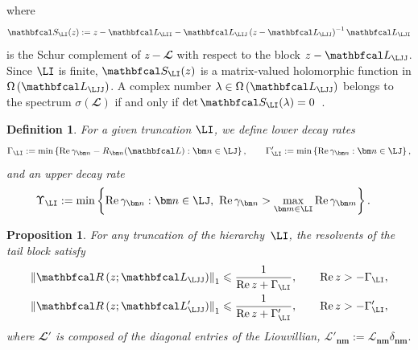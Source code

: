 \documentclass{SciPost}
\renewcommand{\Re}{\operatorname{Re}}
\newtheorem{definition}{Definition}
\newtheorem{proposition}{Proposition}
\begin{document}
where
\begin{equation}
    \mathbfcal S_\LI(z) := z - \mathbfcal L_\LII - \mathbfcal L_\LIJ
    \left(z - \mathbfcal L_\LJJ\right)^{-1} \mathbfcal L_\LJI
\end{equation}
is the Schur complement of \(z-\mathbfcal L\) with respect to the block \(z-\mathbfcal L_\LJJ\). Since \(\LI\) is finite, \(\mathbfcal S_\LI(z)\) is a matrix-valued holomorphic function in \(\Omega\left(\mathbfcal L_\LJJ\right)\). A complex number \(\lambda \in \Omega\left(\mathbfcal L_\LJJ\right)\) belongs to the spectrum \(\sigma(\mathbfcal L)\) if and only if
$\det \mathbfcal S_\LI(\lambda) = 0$~\cite{Griesemer2008}.

\begin{definition}
    For a given truncation \(\LI\), we define \emph{lower decay rates}
    \begin{equation}
        \Gamma_\LI
        :=
        \min \left \{
            \Re \gamma_{\bm n} - R_{\bm n}(\mathbfcal L):
            \bm n \in \LJ
        \right\},
        \qquad
        \Gamma_\LI'
        :=
        \min \left \{
            \Re \gamma_{\bm n} :
            \bm n \in \LJ
        \right\}
        ,
    \end{equation}
    and an \emph{upper decay rate}
    \begin{equation}
        \begin{aligned}
            \Upsilon_\LI
            &:=
            \min \left \{
                \Re \gamma_{\bm n} :
                \bm n \in \LJ,~
                \Re \gamma_{\bm n} > \max_{\bm m \in \LI} \Re \gamma_{\bm m}
            \right\}.
        \end{aligned}
    \end{equation}
\end{definition}
\begin{proposition}
    For any truncation of the hierarchy~$\LI$, the
    resolvents of the tail block satisfy
    \begin{equation}
        \begin{aligned}
            \left\|
            \mathbfcal R\left(z; \mathbfcal L_\LJJ\right)
            \right\|_1
            &\leqslant
            \frac{1}{\Re z + \Gamma_\LI},
            \qquad
            \Re z > -\Gamma_\LI, \\
            \left\|
            \mathbfcal R\left(z; \mathbfcal L_\LJJ'\right)
            \right\|_1
            &\leqslant
            \frac{1}{\Re z + \Gamma_\LI'},
            \qquad
            \Re z > -\Gamma_\LI',
        \end{aligned}
    \end{equation}
    where \(\mathbfcal L'\) is composed of the diagonal entries of the Liouvillian,
    $
        \mathcal L'_{\bm n\bm m}
        :=
        \mathcal L_{\bm n\bm m}\delta_{\bm n\bm m}.
    $

    \label{prop:simplest-bound}
\end{proposition}
\end{document}
